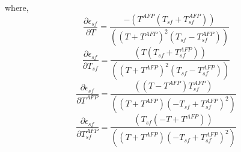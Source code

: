 where,
\begin{equation}
    \frac{\partial \epsilon_{sf}}{\partial T} = \frac{-(T^{AFP} (T_{sf} + T_{sf}^{AFP}))}{((T + T^{AFP})^2 (T_{sf} - T_{sf}^{AFP}))}
\end{equation}
\begin{equation}
    \frac{\partial \epsilon_{sf}}{\partial T_{sf}} = \frac{(T (T_{sf} + T_{sf}^{AFP}))}{((T + T^{AFP})^2 (T_{sf} - T_{sf}^{AFP}))}
\end{equation}
\begin{equation}
    \frac{\partial \epsilon_{sf}}{\partial T^{AFP}} = \frac{((T - T^{AFP}) T_{sf}^{AFP})}{((T + T^{AFP}) (-T_{sf} + T_{sf}^{AFP})^2)}
\end{equation}
\begin{equation}
    \frac{\partial \epsilon_{sf}}{\partial T_{sf}^{AFP}} = \frac{(T_{sf} (-T + T^{AFP}))}{((T + T^{AFP}) (-T_{sf} + T_{sf}^{AFP})^2)}
\end{equation}